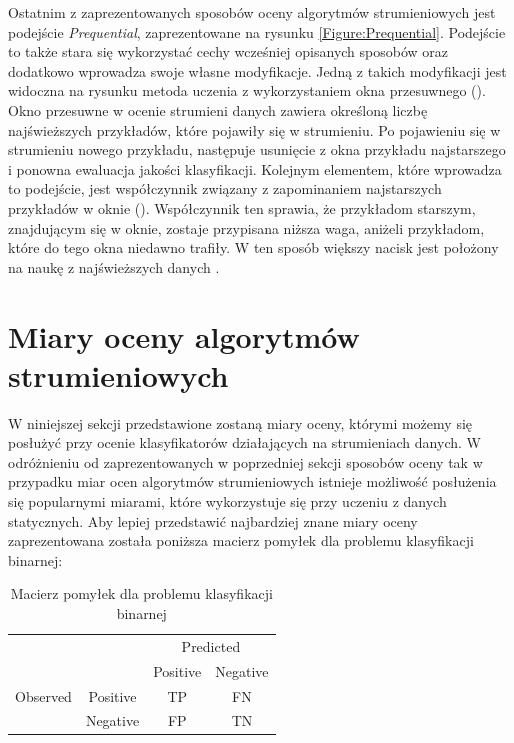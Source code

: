 \noindent Ostatnim z zaprezentowanych sposobów oceny algorytmów strumieniowych jest podejście \textit{Prequential}, zaprezentowane na rysunku \ref{Figure:Prequential}. Podejście to także stara się wykorzystać cechy wcześniej opisanych sposobów oraz dodatkowo wprowadza swoje własne modyfikacje. Jedną z takich modyfikacji jest widoczna na rysunku metoda uczenia z wykorzystaniem okna przesuwnego (). Okno przesuwne w ocenie strumieni danych zawiera określoną liczbę najświeższych przykładów, które pojawiły się w strumieniu. Po pojawieniu się w strumieniu nowego przykładu, następuje usunięcie z okna przykładu najstarszego i ponowna ewaluacja jakości klasyfikacji. Kolejnym elementem, które wprowadza to podejście, jest współczynnik związany z zapominaniem najstarszych przykładów w oknie (). Współczynnik ten sprawia, że przykładom starszym, znajdującym się w oknie, zostaje przypisana niższa waga, aniżeli przykładom, które do tego okna niedawno trafiły. W ten sposób większy nacisk jest położony na naukę z najświeższych danych \cite{Article:Evaluation}.

\section{Miary oceny algorytmów strumieniowych}

\noindent W niniejszej sekcji przedstawione zostaną miary oceny, którymi możemy się posłużyć przy ocenie klasyfikatorów działających na strumieniach danych. W odróżnieniu od zaprezentowanych w poprzedniej sekcji sposobów oceny tak w przypadku miar ocen algorytmów strumieniowych istnieje możliwość posłużenia się popularnymi miarami, które wykorzystuje się przy uczeniu z danych statycznych. Aby lepiej przedstawić najbardziej znane miary oceny zaprezentowana została poniższa macierz pomyłek dla problemu klasyfikacji binarnej:

\begin{center}
\begin{table}[h]
\renewcommand{\arraystretch}{1.5}
\label{tab:macierz}
\begin{center}
\begin{tabular}{|c|c|c|c|}
   \cline{3-4} 
   \multicolumn{1}{c}{} & & \multicolumn{2}{c|}{Predicted} \\ \cline{3-4}
   \multicolumn{1}{c}{} & & Positive & Negative \\ \hline
   
   {Observed}
   & Positive & TP & FN \\ \cline{2-4}
   & Negative & FP & TN  \\ \cline{2-4} \hline
\end{tabular}
\caption{Macierz pomyłek dla problemu klasyfikacji binarnej}
\end{center}
\end{table}
\end{center}

